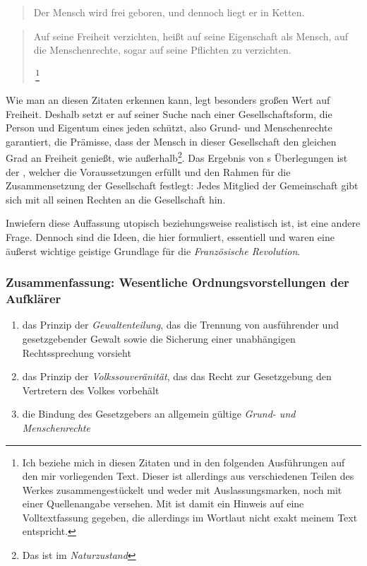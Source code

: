 \blockquote{Der Mensch wird frei geboren, und dennoch liegt er in
Ketten.}

\blockquote[{\,\footnote{Ich beziehe mich in
diesen Zitaten und in den folgenden Ausführungen auf den mir
vorliegenden Text. Dieser ist allerdings aus verschiedenen Teilen des
Werkes zusammengestückelt und weder mit Auslassungsmarken, noch mit
einer Quellenangabe versehen. Mit \cite{DerGesVertr} ist damit ein
Hinweis auf eine Volltextfassung gegeben, die allerdings im Wortlaut
nicht exakt meinem Text entspricht.}}]{Auf seine Freiheit verzichten,
heißt auf seine Eigenschaft als Mensch, auf die Menschenrechte, sogar
auf seine Pflichten zu verzichten.}

Wie man an diesen Zitaten erkennen kann, legt 
besonders großen Wert auf Freiheit. Deshalb setzt er auf seiner Suche
nach einer Gesellschaftsform, die Person und Eigentum eines jeden
schützt, also Grund- und Menschenrechte garantiert, die Prämisse, dass
der Mensch in dieser Gesellschaft den gleichen Grad an Freiheit
genießt, wie außerhalb\footnote{Das ist im
\emph{Naturzustand}}.  Das Ergebnis von
s Überlegungen ist der ,
welcher die Voraussetzungen erfüllt und den Rahmen für die
Zusammensetzung der Gesellschaft festlegt: Jedes Mitglied der
Gemeinschaft gibt sich mit all seinen Rechten an die Gesellschaft hin.

Inwiefern diese Auffassung utopisch beziehungsweise realistisch ist,
ist eine andere Frage. Dennoch sind die Ideen, die 
hier formuliert, essentiell und waren eine äußerst wichtige geistige
Grundlage für die \emph{Französische Revolution}.


\subsubsection{Zusammenfassung: Wesentliche Ordnungsvorstellungen der
Aufklärer}

\begin{enumerate}
\item  das Prinzip der \emph{Gewaltenteilung}, das die Trennung von
ausführender und gesetzgebender Gewalt sowie die Sicherung einer
unabhängigen Rechtssprechung vorsieht
\item das Prinzip der \emph{Volkssouveränität}, das das Recht zur
Gesetzgebung den Vertretern des Volkes vorbehält
\item die Bindung des Gesetzgebers an allgemein gültige \emph{Grund-
und Menschenrechte}
\end{enumerate}

